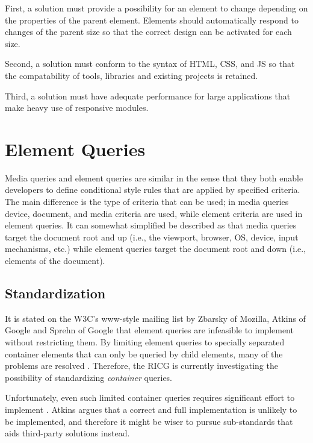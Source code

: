 \documentclass{acm_proc_article-sp}
\begin{document}
      First, a solution must provide a possibility for an element to change depending on the properties of the parent element.
      Elements should automatically respond to changes of the parent size so that the correct design can be activated for each size.

      Second, a solution must conform to the syntax of HTML, CSS, and JS so that the compatability of tools, libraries and existing projects is retained.

      Third, a solution must have adequate performance for large applications that make heavy use of responsive modules.



\section{Element Queries}
  Media queries and element queries are similar in the sense that they both enable developers to define conditional style rules that are applied by specified criteria.
  The main difference is the type of criteria that can be used; in media queries device, document, and media criteria are used, while element criteria are used in element queries.
  It can somewhat simplified be described as that media queries target the document root and up (i.e., the viewport, browser, OS, device, input mechanisms, etc.) while element queries target the document root and down (i.e., elements of the document).

  \subsection{Standardization}
    It is stated on the W3C's www-style mailing list \cite{w3c_eq_mail} by Zbarsky of Mozilla, Atkins of Google and Sprehn of Google that element queries are infeasible to implement without restricting them.
    By limiting element queries to specially separated container elements that can only be queried by child elements, many of the problems are resolved \cite{ricg_irc_log,ricg_issue_viewport}.
    Therefore, the RICG is currently investigating the possibility of standardizing \emph{container} queries.

    Unfortunately, even such limited container queries requires significant effort to implement \cite{ricg_issue_viewport}.
    Atkins argues that a correct and full implementation is unlikely to be implemented, and therefore it might be wiser to pursue sub-standards that aids third-party solutions instead.
\end{document}
